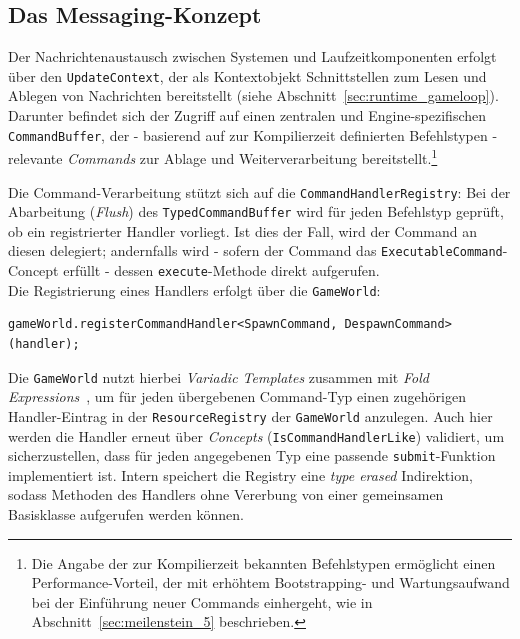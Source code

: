 \subsection{Das Messaging-Konzept}\label{sec:runtime_messaging}

Der Nachrichtenaustausch zwischen Systemen und Laufzeitkomponenten erfolgt über den \texttt{UpdateContext}, der als Kontextobjekt Schnittstellen zum Lesen und Ablegen von Nachrichten bereitstellt (siehe Abschnitt~\ref{sec:runtime_gameloop}).
Darunter befindet sich der Zugriff auf einen zentralen und Engine-spezifischen \texttt{CommandBuffer}, der - basierend auf zur Kompilierzeit definierten Befehlstypen - relevante \textit{Commands} zur Ablage und Weiterverarbeitung bereitstellt.\footnote{
    Die Angabe der zur Kompilierzeit bekannten Befehlstypen ermöglicht einen Performance-Vorteil, der mit erhöhtem Bootstrapping- und Wartungsaufwand bei der Einführung neuer Commands einhergeht, wie in Abschnitt~\ref{sec:meilenstein_5} beschrieben.
}

Die Command-Verarbeitung stützt sich auf die \texttt{CommandHandlerRegistry}:
Bei der Abarbeitung (\textit{Flush}) des \texttt{TypedCommandBuffer} wird für jeden Befehlstyp geprüft, ob ein registrierter Handler vorliegt.
Ist dies der Fall, wird der Command an diesen delegiert; andernfalls wird - sofern der Command das \texttt{ExecutableCommand}-Concept erfüllt - dessen \texttt{execute}-Methode direkt aufgerufen.\\

Die Registrierung eines Handlers erfolgt über die \texttt{GameWorld}:

\begin{verbatim}
gameWorld.registerCommandHandler<SpawnCommand, DespawnCommand>(handler);
\end{verbatim}

Die \texttt{GameWorld} nutzt hierbei \textit{Variadic Templates} zusammen mit \textit{Fold Expressions}~\cite[S. 82-118]{Ban22}, um für jeden übergebenen Command-Typ einen zugehörigen Handler-Eintrag in der \texttt{ResourceRegistry} der \texttt{GameWorld} anzulegen.
Auch hier werden die Handler erneut über \textit{Concepts} (\texttt{IsCommandHandlerLike}) validiert, um sicherzustellen, dass für jeden angegebenen Typ eine passende \texttt{submit}-Funktion implementiert ist.
Intern speichert die Registry eine \textit{type erased} Indirektion, sodass Methoden des Handlers ohne Vererbung von einer gemeinsamen Basisklasse aufgerufen werden können.

